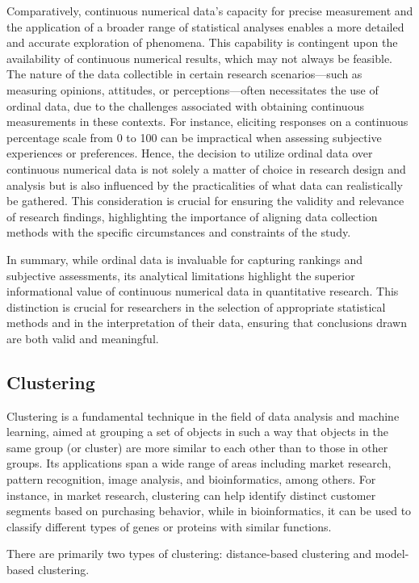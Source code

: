 \documentclass{article}
\begin{document}
Comparatively, continuous numerical data's capacity for precise measurement and the application of a broader range of statistical analyses enables a more detailed and accurate exploration of phenomena. 
This capability is contingent upon the availability of continuous numerical results, which may not always be feasible. The nature of the data collectible in certain research scenarios—such as measuring opinions, attitudes, or perceptions—often necessitates the use of ordinal data, due to the challenges associated with obtaining continuous measurements in these contexts. For instance, eliciting responses on a continuous percentage scale from 0 to 100 can be impractical when assessing subjective experiences or preferences. Hence, the decision to utilize ordinal data over continuous numerical data is not solely a matter of choice in research design and analysis but is also influenced by the practicalities of what data can realistically be gathered. This consideration is crucial for ensuring the validity and relevance of research findings, highlighting the importance of aligning data collection methods with the specific circumstances and constraints of the study.

In summary, while ordinal data is invaluable for capturing rankings and subjective assessments, 
its analytical limitations highlight the superior informational value of continuous numerical data in quantitative research. 
This distinction is crucial for researchers in the selection of appropriate statistical methods and in the interpretation of their data, 
ensuring that conclusions drawn are both valid and meaningful.

\subsection{Clustering}

Clustering is a fundamental technique in the field of data analysis and machine learning, aimed at grouping a set of objects in such a way that objects in the same group (or cluster) are more similar to each other than to those in other groups. Its applications span a wide range of areas including market research, pattern recognition, image analysis, and bioinformatics, among others. For instance, in market research, clustering can help identify distinct customer segments based on purchasing behavior, while in bioinformatics, it can be used to classify different types of genes or proteins with similar functions.

There are primarily two types of clustering: distance-based clustering and model-based clustering.
\end{document}
